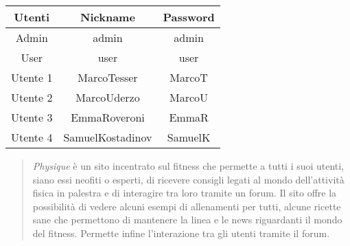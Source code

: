 \begin{table}[H]
	\centering
	\begin{tabular}{c|c c}
		\textbf{Utenti} & \textbf{Nickname} & \textbf{Password} \\
		\hline
		Admin           & admin        			& admin        \\
		User            & user         			& user         \\
		Utente 1        & MarcoTesser 			& MarcoT       \\
		Utente 2        & MarcoUderzo  			& MarcoU       \\
		Utente 3        & EmmaRoveroni 			& EmmaR        \\
		Utente 4        & SamuelKostadinov  	& SamuelK      \\

	\end{tabular}
\end{table}
\newpage
{}
\tableofcontents
\newpage
{}
\renewcommand{\abstractname}{Abstract}
\begin{abstract}
	\emph{Physique} è un sito incentrato sul fitness che permette a tutti i suoi utenti, siano essi neofiti o esperti, di ricevere consigli legati al mondo dell'attività fisica in palestra e di interagire tra loro tramite un forum. \newline
	Il sito offre la possibilità di vedere alcuni esempi di allenamenti per tutti, alcune ricette sane che permettono di mantenere la linea e le news riguardanti il mondo del fitness. Permette infine l'interazione tra gli utenti tramite il forum.
\end{abstract}
\newpage

\newpage

\newpage

\newpage

\newpage



